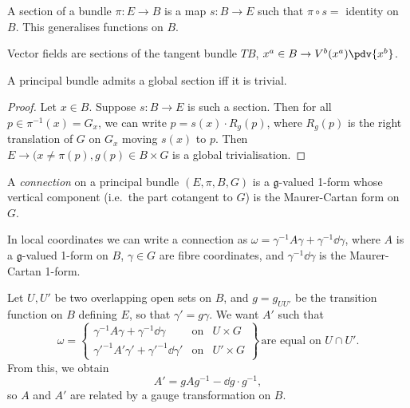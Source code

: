 \documentclass{jknotes}
\begin{document}
\begin{defn}
    A section of a bundle \(\pi:E\to B\) is a map \(s:B\to E\) such that \(\pi\circ s = \) identity on \(B\). This generalises functions on \(B\).
\end{defn}

\begin{eg}
    Vector fields are sections of the tangent bundle \(TB\), \(x^a \in B \to V^b(x^a)\pdv{x^b}\).
\end{eg}

\begin{lemma}
    A principal bundle admits a global section iff it is trivial.
\end{lemma}
\begin{proof}
    Let \(x\in B\). Suppose \(s:B\to E\) is such a section. Then for all \(p \in \pi^{-1}(x)= G_x\), we can write \(p=s(x)\cdot R_g(p)\), where \(R_g(p)\) is the right translation of \(G\) on \(G_x\) moving \(s(x)\) to \(p\). Then \(E\to(x\ne\pi(p),g(p)\in B\times G\) is a global trivialisation.
\end{proof}

\begin{defn}
    A \emph{connection} on a principal bundle \((E,\pi,B,G)\) is a \(\mathfrak{g}\)-valued 1-form whose vertical component (i.e.\ the part cotangent to \(G\)) is the Maurer-Cartan form on \(G\).
\end{defn}

In local coordinates we can write a connection as \(\omega=\gamma^{-1}A\gamma + \gamma^{-1}\dd{\gamma}\), where \(A\) is a \(\mathfrak{g}\)-valued 1-form on \(B\), \(\gamma\in G\) are fibre coordinates, and \(\gamma^{-1}\dd{\gamma}\) is the Maurer-Cartan 1-form.

Let \(U,U'\) be two overlapping open sets on \(B\), and \(g=g_{UU'}\) be the transition function on \(B\) defining \(E\), so that \(\gamma' = g\gamma\). We want \(A'\) such that
\begin{equation}
    \omega = \begin{Bmatrix}
        \gamma^{-1}A\gamma + \gamma^{-1}\dd{\gamma} &\text{on}& U\times G \\
        {\gamma'}^{-1}A'\gamma' + {\gamma'}^{-1}\dd{\gamma'} &\text{on}& U'\times G
    \end{Bmatrix}\, \text{are equal on \(U\cap U'\)}.
\end{equation}
From this, we obtain
\begin{equation}
    A' = gAg^{-1} - \dd{g}\cdot g^{-1},
\end{equation}
so \(A\) and \(A'\) are related by a gauge transformation on \(B\).
\end{document}

